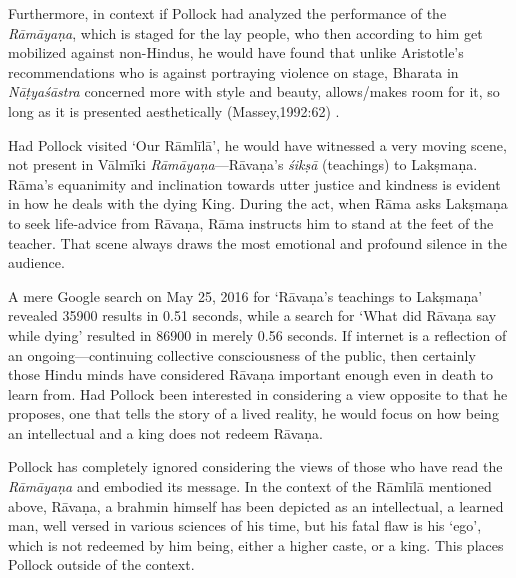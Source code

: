 Furthermore, in context if Pollock had analyzed the performance of the \textit{Rāmāyaṇa}, which is staged for the lay people, who then according to him get mobilized against non-Hindus, he would have found that unlike Aristotle’s recommendations who is against portraying violence on stage, Bharata in \textit{Nāṭyaśāstra} concerned more with style and beauty, allows/makes room for it, so long as it is presented aesthetically (Massey,1992:62) .

Had Pollock visited ‘Our Rāmlīlā’, he would have witnessed a very moving scene, not present in Vālmīki \textit{Rāmāyaṇa}—Rāvaṇa’s \textit{śikṣā} (teachings) to Lakṣmaṇa. Rāma’s equanimity and inclination towards utter justice and kindness is evident in how he deals with the dying King. During the act, when Rāma asks Lakṣmaṇa to seek life-advice from Rāvaṇa, Rāma instructs him to stand at the feet of the teacher. That scene always draws the most emotional and profound silence in the audience.

A mere Google search on May 25, 2016 for ‘Rāvaṇa’s teachings to Lakṣmaṇa’ revealed 35900 results in 0.51 seconds, while a search for ‘What did Rāvaṇa say while dying’ resulted in 86900 in merely 0.56 seconds. If internet is a reflection of an ongoing—continuing collective consciousness of the public, then certainly those Hindu minds have considered Rāvaṇa important enough even in death to learn from. Had Pollock been interested in considering a view opposite to that he proposes, one that tells the story of a lived reality, he would focus on how being an intellectual and a king does not redeem Rāvaṇa.

Pollock has completely ignored considering the views of those who have read the \textit{Rāmāyaṇa} and embodied its message. In the context of the Rāmlīlā mentioned above, Rāvaṇa, a brahmin himself has been depicted as an intellectual, a learned man, well versed in various sciences of his time, but his fatal flaw is his ‘ego’, which is not redeemed by him being, either a higher caste, or a king. This places Pollock outside of the context.


